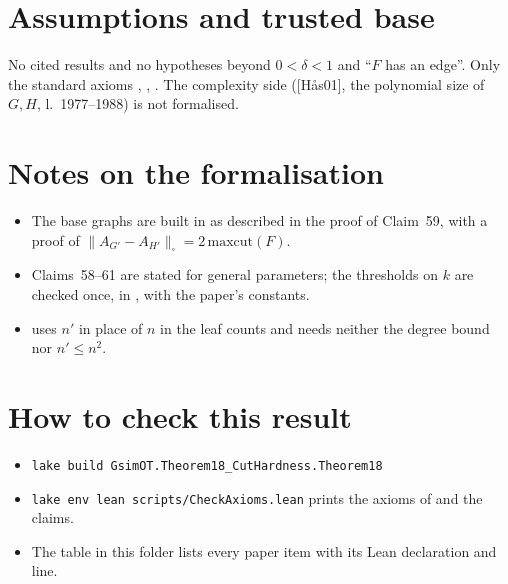 \section{Assumptions and trusted base}
No cited results and no hypotheses beyond $0<\delta<1$ and ``$F$ has an edge''. Only the standard axioms
, , . The complexity side ([H\aa s01], the polynomial size
of $G,H$, l.~1977--1988) is not formalised.

\section{Notes on the formalisation}
\begin{itemize}
\item The base graphs are built in  as described in the proof of Claim~59, with a proof of
  $\|A_{G'}-A_{H'}\|_\square=2\,\mathrm{maxcut}(F)$.
\item Claims~58--61 are stated for general parameters; the thresholds on $k$ are checked once, in
  , with the paper's constants.
\item {} uses $n'$ in place of $n$ in the leaf counts and needs neither the degree bound
  nor $n'\le n^2$.
\end{itemize}

\section{How to check this result}
\begin{itemize}
\item \texttt{lake build GsimOT.Theorem18\_CutHardness.Theorem18}
\item \texttt{lake env lean scripts/CheckAxioms.lean} prints the axioms of
   and the claims.
\item The table  in this folder lists every paper item with its Lean
  declaration and line.
\end{itemize}

